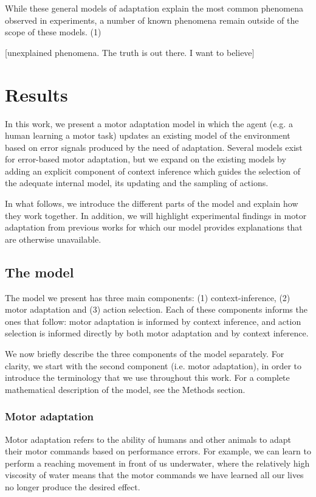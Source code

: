 \documentclass[a4paper,doc,floatsintext,natbib]{apa6}
\begin{document}
While these general models of adaptation explain the most common phenomena observed in experiments, a number of known phenomena remain outside of the scope of these models. (1)

[unexplained phenomena. The truth is out there. I want to believe]

\section{Results}
In this work, we present a motor adaptation model in which the agent (e.g. a human learning a motor task) updates an existing model of the environment based on error signals produced by the need of adaptation. Several models exist for error-based motor adaptation, but we expand on the existing models by adding an explicit component of context inference which guides the selection of the adequate internal model, its updating and the sampling of actions.

In what follows, we introduce the different parts of the model and explain how they work together. In addition, we will highlight experimental findings in motor adaptation from previous works for which our model provides explanations that are otherwise unavailable.

\subsection{The model}
The model we present has three main components: (1) context-inference, (2) motor adaptation and (3) action selection. Each of these components informs the ones that follow: motor adaptation is informed by context inference, and action selection is informed directly by both motor adaptation and by context inference.

We now briefly describe the three components of the model separately. For clarity, we start with the second component (i.e. motor adaptation), in order to introduce the terminology that we use throughout this work. For a complete mathematical description of the model, see the Methods section.

\subsubsection{Motor adaptation}
Motor adaptation refers to the ability of humans and other animals to adapt their motor commands based on performance errors. For example, we can learn to perform a reaching movement in front of us underwater, where the relatively high viscosity of water means that the motor commands we have learned all our lives no longer produce the desired effect.
\end{document}
